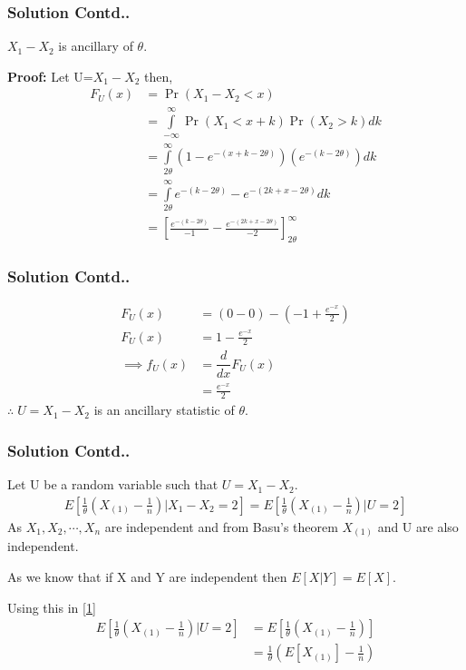 \documentclass{beamer}
\providecommand{\pr}[1]{\ensuremath{\Pr\left(#1\right)}}
\providecommand{\pr}[1]{\ensuremath{\Pr\left(#1\right)}}
\providecommand{\sbrak}[1]{\ensuremath{{}\left[#1\right]}}
\providecommand{\brak}[1]{\ensuremath{\left(#1\right)}}
\begin{document}
\begin{frame}
\frametitle{Solution Contd..}
    $X_1-X_2$ is ancillary of $\theta$.
    
    \textbf{Proof: }Let U=$X_1-X_2$ then,
    \begin{align}
     \nonumber   F_U(x)&=\pr{X_1-X_2<x}\\
    \nonumber
    &=\int\limits_{-\infty}^{\infty}\pr{X_1<x+k}\pr{X_2>k} dk\\
  \nonumber      &= \int\limits_{2\theta}^{\infty}\brak{1-e^{-\brak{x+k-2\theta}}}\brak{e^{-\brak{k-2\theta}}} dk\\
 \nonumber &=\int\limits_{2\theta}^{\infty}e^{-\brak{k-2\theta}}-e^{-\brak{2k+x-2\theta}} dk\\
\nonumber &= \sbrak{\frac{e^{-\brak{k-2\theta}}}{-1}-\frac{e^{-\brak{2k+x-2\theta}}}{-2}}_{2\theta}^{\infty}
    \end{align}
\end{frame}

 \begin{frame}
 \frametitle{Solution Contd..}
 \begin{align}
\nonumber  F_U(x) &=(0-0)-\brak{-1+\frac{e^{-x}}{2}}\\
    F_U(x)&= 1-\frac{e^{-x}}{2}\\
    \implies f_U(x)&=\dfrac{d}{dx}F_U(x)\\
    &=\frac{e^{-x}}{2}
    \end{align}
    $\therefore\;U=X_1-X_2$ is an ancillary statistic of $\theta$.
\end{frame}

\begin{frame}
 \frametitle{Solution Contd..}
 Let U be a random variable such that $U=X_1-X_2$.
\begin{align}
    E\sbrak{\frac{1}{\theta}\brak{X_{(1)}-\frac{1}{n}}|X_1-X_2=2}=E\sbrak{\frac{1}{\theta}\brak{X_{(1)}-\frac{1}{n}}|U=2}\label{1}
\end{align}
As $X_1,X_2,\cdots,X_n$ are independent and from Basu's theorem $X_{(1)}$ and U are also independent. 

As we know that if X and Y are independent then $E\sbrak{X|Y}=E\sbrak{X}$. 

Using this in \eqref{1}
\begin{align}
 \nonumber   E\sbrak{\frac{1}{\theta}\brak{X_{(1)}-\frac{1}{n}}|U=2}
    &=E\sbrak{\frac{1}{\theta}\brak{X_{(1)}-\frac{1}{n}}}\\
    &=\frac{1}{\theta}\brak{E\sbrak{X_{(1)}}-\frac{1}{n}}\label{a}
\end{align}
\end{frame}
\end{document}
